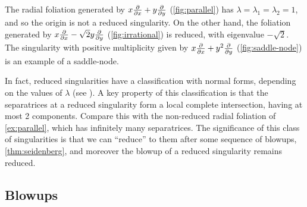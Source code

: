 \begin{example}
    The radial foliation generated by $x\pdv{}{x}+y\pdv{}{y}$
    (\cref{fig:parallel}) has $\lambda=\lambda_1=\lambda_2=1$, and so the origin
    is not a reduced singularity. On the other hand, the foliation generated by
    $x\pdv{}{x}-\sqrt2y\pdv{}{y}$ (\cref{fig:irrational}) is reduced, with
    eigenvalue $-\sqrt2$. The singularity with positive multiplicity given
    by $x\pdv{}{x}+y^2\pdv{}{y}$ (\cref{fig:saddle-node}) is an example of a
    saddle-node.
\end{example}

In fact, reduced singularities have a classification with normal forms,
depending on the values of $\lambda$ (see \cite[\S1]{brunella_book}). A key
property of this classification is that the separatrices at a reduced
singularity form a local complete intersection, having at most 2 components.
Compare this with the non-reduced radial foliation of \cref{ex:parallel}, which
has infinitely many separatrices. The significance of this class of
singularities is that we can ``reduce'' to them after some sequence of blowups,
\cref{thm:seidenberg}, and moreover the blowup of a reduced singularity remains
reduced.

\subsection{Blowups}

